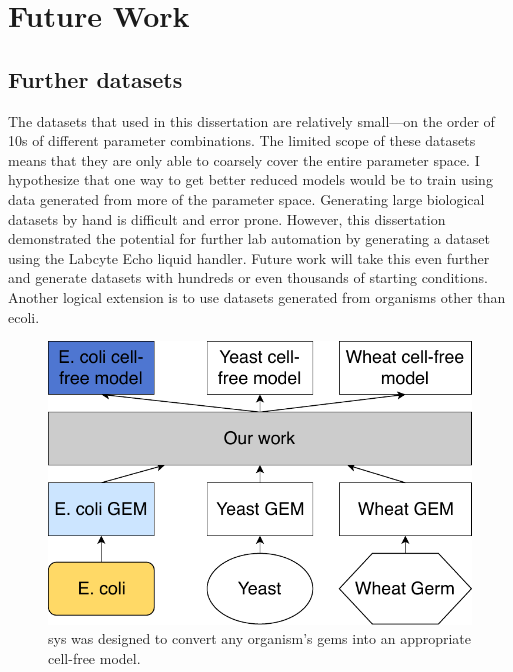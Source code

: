 \chapter{Future Work} \label{chap:fw}

\section{Further datasets}
The datasets that used in this dissertation are relatively small---on the order of 10s of different parameter combinations.
The limited scope of these datasets means that they are only able to coarsely cover the entire parameter space.
I hypothesize that one way to get better reduced models would be to train using data generated from more of the parameter space.
Generating large biological datasets by hand is difficult and error prone.
However, this dissertation demonstrated the potential for further lab automation by generating a dataset using the Labcyte Echo liquid handler.
Future work will take this even further and generate datasets with hundreds or even thousands of starting conditions.
Another logical extension is to use datasets generated from organisms other than \gls{ecoli}.

\begin{figure}[t!]
\begin{center}
\includegraphics{figs/Vision.pdf}
\caption[\gls{sys} can generate cell-free models for any organism]
{\gls{sys} was designed to convert any organism's \glspl{gem} into an appropriate cell-free model.
}
\end{center}
\label{fig:vision}
\end{figure}

